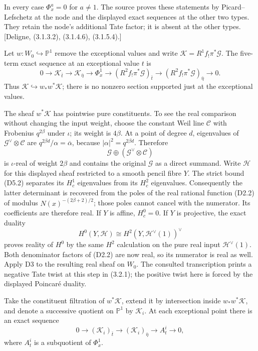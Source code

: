 In every case \(\Phi_x^a=0\) for \(a\ne1\). The source proves these
statements by Picard--Lefschetz at the node and the displayed exact
sequences at the other two types. They retain the node's additional Tate
factor; it is absent at the other types. {[}Deligne, (3.1.3.2),
(3.1.4.6), (3.1.5.4).{]}

Let \(w:W_0\hookrightarrow\mathbb P^1\) remove the exceptional values
and write \(\mathcal K=R^1f_!\pi^*\mathcal G\). The five-term exact
sequence at an exceptional value \(t\) is \[
0\to\mathcal K_{\bar t}\to\mathcal K_{\bar\eta}
\to\Phi_x^1
\to(R^2f_!\pi^*\mathcal G)_{\bar t}
\to(R^2f_!\pi^*\mathcal G)_{\bar\eta}\to0.
\tag{D6.5}
\] Thus \(\mathcal K\hookrightarrow w_*w^*\mathcal K\); there is no
nonzero section supported just at the exceptional values.

The sheaf \(w^*\mathcal K\) has pointwise pure constituents. To see the
real comparison without changing the input weight, choose the constant
Weil line \(\mathcal C\) with Frobenius \(q^{2\beta}\) under \(\iota\);
its weight is \(4\beta\). At a point of degree \(d\), eigenvalues of
\(\mathcal G^\vee\otimes\mathcal C\) are
\(q^{2\beta d}/\alpha=\overline\alpha\), because
\(|\alpha|^2=q^{2\beta d}\). Therefore \[
\mathcal G\oplus(\mathcal G^\vee\otimes\mathcal C)
\tag{D6.6}
\] is \(\iota\)-real of weight \(2\beta\) and contains the original
\(\mathcal G\) as a direct summand. Write \(\mathcal H\) for this
displayed sheaf restricted to a smooth pencil fibre \(Y\). The strict
bound (D5.2) separates its \(H_c^1\) eigenvalues from its \(H_c^2\)
eigenvalues. Consequently the latter determinant is recovered from the
poles of the real rational function (D2.2) of modulus
\(N(x)^{-(2\beta+2)/2}\); those poles cannot cancel with the numerator.
Its coefficients are therefore real. If \(Y\) is affine, \(H_c^0=0\). If
\(Y\) is projective, the exact duality \[
H^0(Y,\mathcal H)\cong H^2(Y,\mathcal H^\vee(1))^\vee
\] proves reality of \(H^0\) by the same \(H^2\) calculation on the pure
real input \(\mathcal H^\vee(1)\). Both denominator factors of (D2.2)
are now real, so its numerator is real as well. Apply D3 to the
resulting real sheaf on \(W_0\). The consulted transcription prints a
negative Tate twist at this step in (3.2.1); the positive twist here is
forced by the displayed Poincaré duality.

Take the constituent filtration of \(w^*\mathcal K\), extend it by
intersection inside \(w_*w^*\mathcal K\), and denote a successive
quotient on \(\mathbb P^1\) by \(\mathcal K_i\). At each exceptional
point there is an exact sequence \[
0\to(\mathcal K_i)_{\bar t}\to(\mathcal K_i)_{\bar\eta}
\to A_t^i\to0,
\tag{D6.7}
\] where \(A_t^i\) is a subquotient of \(\Phi_x^1\).

